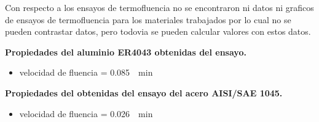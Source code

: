 \documentclass[12pt,a4paper]{article}
\begin{document}
Con respecto a los ensayos de termofluencia no se encontraron ni datos ni graficos de ensayos de termofluencia para los materiales trabajados por lo cual no se pueden contrastar datos, pero todovia se pueden calcular valores con estos datos.

\textbf{Propiedades del aluminio ER4043 obtenidas del ensayo.}

\begin{itemize}
    \item velocidad de fluencia = \SI{0.085}{\per\minute}
\end{itemize}

\textbf{Propiedades del  obtenidas del ensayo del acero AISI/SAE 1045.}

\begin{itemize}
    \item velocidad de fluencia = \SI{0.026}{\per\minute}
\end{itemize}
\end{document}
